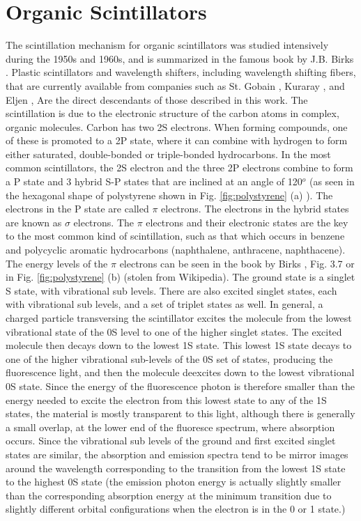 \section{Organic Scintillators}
The scintillation mechanism for organic scintillators
was studied intensively during
the 1950s and 1960s, and is summarized in the famous book by
J.B. Birks \cite{birks}. 
Plastic scintillators and wavelength shifters, including
wavelength shifting fibers, that are currently available
from companies such as St. Gobain \cite{stgobain}, Kuraray \cite{kuraray}, and 
Eljen \cite{eljen}, Are the direct descendants of those
described in this work.  The scintillation is due to the
electronic structure of the carbon atoms in complex, organic molecules.  
Carbon
has two 2S electrons.  When forming compounds, one of these is promoted
to a 2P state, where it can combine with hydrogen to
form either saturated, double-bonded or triple-bonded hydrocarbons.  
In the most common scintillators,
the 2S electron and the three 2P electrons combine to form a P state and 
3 hybrid S-P states that are inclined
at an angle of 120$^o$ (as seen in the hexagonal shape of
polystyrene shown in Fig. \ref{fig:polystyrene} (a) ).  
The electrons in the P state are called $\pi$ electrons.
The electrons in the hybrid states are
known as $\sigma$ electrons.
The $\pi$ electrons and their electronic states
are the key to the most common
kind of scintillation, such as that which occurs 
in benzene and polycyclic aromatic hydrocarbons (naphthalene, 
anthracene, naphthacene).  The energy levels of the $\pi$
electrons can be seen in the book by Birks \cite{birks}, Fig. 3.7
or in Fig. \ref{fig:polystyrene} (b) (stolen from Wikipedia).  The
ground state is a singlet S state, with vibrational sub levels. 
There are also excited singlet states, each with vibrational sub levels,
and a set of triplet states as well.  In general, a charged
particle transversing the scintillator
excites the molecule from the lowest vibrational state of the
0S level
to one of the higher singlet states.  The excited molecule
then decays down to the lowest 1S state.  This lowest 1S state decays to
one of the higher vibrational sub-levels of the 0S set of states,
producing the fluorescence light, and then the molecule
deexcites down to the lowest vibrational 0S state.  Since the energy of
the fluorescence photon is therefore smaller than the energy needed to
excite the electron from this lowest state to any of the 1S states,
the material is mostly transparent to this light, although
there is generally a small overlap, at the lower end of the 
fluoresce spectrum, where absorption occurs.  Since the
vibrational sub levels of the ground and first excited singlet 
states are similar, the absorption and emission spectra tend to
be mirror images around the wavelength corresponding to the transition
from the lowest 1S state to the highest 0S state (the
emission photon energy is actually slightly smaller than
the corresponding absorption energy at the minimum 
transition due to slightly different orbital configurations
when the electron is in the 0 or 1 state\cite{brown}.)

